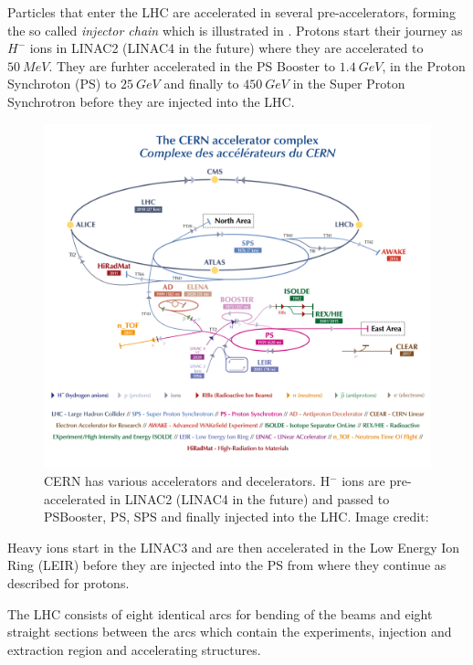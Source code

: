 Particles that enter the LHC are accelerated in several pre-accelerators, forming the so called
\emph{injector chain}\cite{Schindl1999} which is illustrated in .
Protons start their journey as $H^-$ ions in LINAC2 (LINAC4 in the future) where
they are accelerated to $\SI{50}{MeV}$. They are furhter accelerated in the PS Booster to $\SI{1.4}{GeV}$,
in the Proton Synchroton (PS) to $\SI{25}{GeV}$ and finally to $\SI{450}{GeV}$ in the Super Proton Synchrotron
before they are injected into the LHC.
%
\begin{figure}[h]
    \centering
    \includegraphics[width=\textwidth]{CCC-v2019-final-white_small}
    \caption{CERN has various accelerators and decelerators. H$^-$ ions are pre-accelerated
    in LINAC2 (LINAC4 in the future) and passed to PSBooster, PS, SPS and finally injected into
    the LHC. Image credit: \cite{CERN_AccCmplx}}
    \label{fig_cern_acc_cmplx}
\end{figure}
%
Heavy ions start in the LINAC3 and are then accelerated in the Low Energy Ion Ring (LEIR) before they are injected into
the PS from where they continue as described for protons.

The LHC consists of eight identical arcs for bending of the beams and eight straight sections between the
arcs which contain the experiments, injection and extraction region and accelerating structures.

